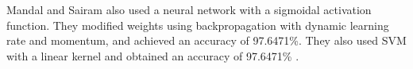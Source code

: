 \documentclass[draftcopy]{srpaper}
\begin{document}
Mandal and Sairam also used a neural network with a sigmoidal activation function. They modified weights using backpropagation with dynamic
learning rate and momentum, and achieved an accuracy of 97.6471\%.
They also used SVM with a linear kernel and obtained an
accuracy of 97.6471\% \cite{MS12}.



\end{document}
